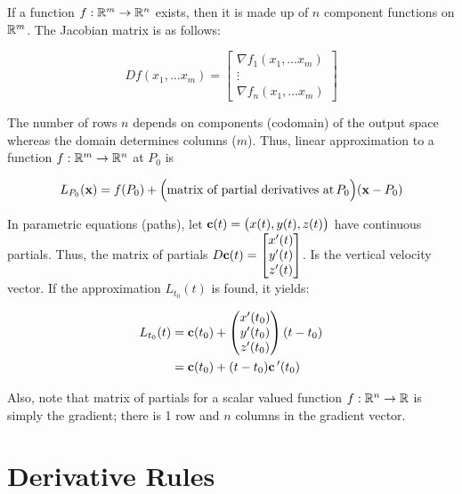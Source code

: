If a function $f:\mathbb{R}^m\to \mathbb{R}^n$ exists, then it is made up of $n$ component functions on $\mathbb{R}^m$. The Jacobian matrix is as follows:

\[Df\left( x_1,\ldots x_m\right) =\begin{bmatrix} \nabla f_{1}\left(x_1,\ldots x_m\right) \\ \vdots \\ \nabla f_{n}\left(x_1,\ldots x_m\right) \end{bmatrix}\]

The number of rows $n$ depends on components (codomain) of the output space whereas the domain determines columns ($m$). Thus, linear approximation to a function $f:\mathbb{R}^m\to \mathbb{R}^n$ at $P_0$ is

\[L_{P_0}(\textbf{x})=f(P_0)+\Big(\mbox{matrix of partial derivatives at}\,P_0\Big)(\textbf{x}-P_0)\]

In parametric equations (paths), let $\textbf{c}(t)=\big(x(t), y(t), z(t) \big)$ have continuous partials.
Thus, the matrix of partials $D\textbf c(t)=\begin{bmatrix}x'(t)\\y'(t)\\z'(t)\end{bmatrix}$. Is the vertical velocity vector.
If the approximation $L_{t_0}(t)$ is found, it yields:

\begin{align*}
    L_{t_0}(t)&=\textbf c(t_0)+
    \left(
    \begin{matrix}
    x'(t_0)\\
    y'(t_0)\\
    z'(t_0)\\
    \end{matrix}
    \right)
    (t-t_0)\\
    &=\textbf{c} (t_0)+(t-t_0)\textbf c\,'(t_0)
\end{align*}

Also, note that matrix of partials for a scalar valued function $f:\mathbb{R}^n\to \mathbb{R}$ is simply the gradient; there is 1 row and $n$ columns in the gradient vector.

\section{Derivative Rules}

